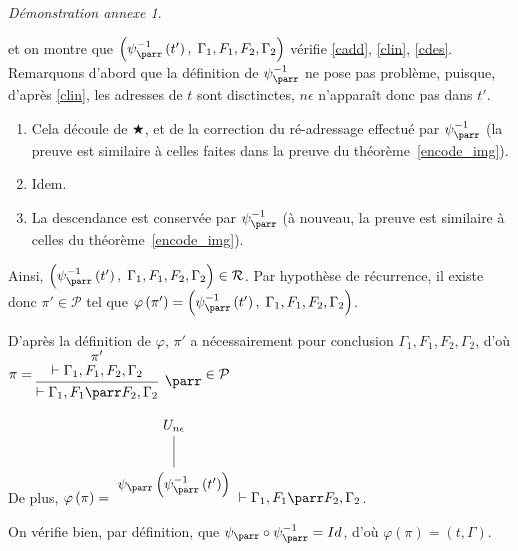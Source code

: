 \documentclass[11pt,a4paper]{article}
\theoremstyle{plain}
\theoremstyle{definition}
\theoremstyle{remark}
\newtheorem{demonstrationappendix}{Démonstration annexe}
\newcommand*{\namedproofv}[2]{\hypo{#1}\infer[no rule]{1}{\vdash #2}}
\newcommand*{\parrv}[1]{\infer{1}[\ensuremath{\parr}]{\vdash #1}}
\newcommand*{\sequent}{\Gamma}
\newcommand*{\proofs}{\ensuremath{\mathcal{P}}}
\newcommand*{\representations}{\ensuremath{\mathcal{R}}}
\newcommand*{\encode}{\ensuremath{\varphi}}
\begin{document}
\begin{demonstrationappendix}
\begin{description}
        et on montre que $\left( \psi_\parr^{-1} \left( t' \right), \; \sequent_1, F_1, F_2, \sequent_2 \right)$ vérifie \ref{cadd}, \ref{clin}, \ref{cdes}. Remarquons d'abord que la définition de $\psi_\parr^{-1}$ ne pose pas problème, puisque, d'après \ref{clin}, les adresses de $t$ sont disctinctes, $n \epsilon$ n'apparaît donc pas dans $t'$.
    
        \begin{enumerate}
            \item Cela découle de $\bigstar$, et de la correction du ré-adressage effectué par $\psi_\parr^{-1}$ (la preuve est similaire à celles faites dans la preuve du théorème~\ref{encode_img}).
    
            \item Idem.
    
            \item La descendance est conservée par $\psi_\parr^{-1}$ (à nouveau, la preuve est similaire à celles du théorème~\ref{encode_img}).
        \end{enumerate}
    
        Ainsi, $\left( \psi_\parr^{-1} \left( t' \right), \; \sequent_1, F_1, F_2, \sequent_2 \right) \in \representations$. Par hypothèse de récurrence, il existe donc $\pi' \in \proofs$ tel que $\encode \left( \pi' \right) = \left( \psi_\parr^{-1} \left( t' \right), \; \sequent_1, F_1, F_2, \sequent_2 \right)$.
        
        D'après la définition de $\encode$, $\pi'$ a nécessairement pour conclusion $\sequent_1, F_1, F_2, \sequent_2$, d'où
        $\pi = 
        \begin{prooftree}
            \namedproofv{\pi'}{\sequent_1, F_1, F_2, \sequent_2}
            \parrv{\sequent_1, F_1 \parr F_2, \sequent_2}
        \end{prooftree} 
        \in \proofs$
    
        De plus, $\encode \left( \pi \right) = 
        \begin{tikzpicture}%
        [level distance=1.5cm,
        level 2/.style={sibling distance=3.5cm}]
        \node {$U_{n \epsilon}$}
            child {node {$\psi_\parr \left( \psi_\parr^{-1} \left(
               t' \right) \right)$}
        };
        \end{tikzpicture} \vdash \sequent_1, F_1 \parr F_2, \sequent_2$.
    
        On vérifie bien, par définition, que $\psi_\parr \circ \psi_\parr^{-1} = Id$, d'où $\encode \left( \pi \right) = (t, \sequent)$.
    

\end{description}
\end{demonstrationappendix}
\end{document}
